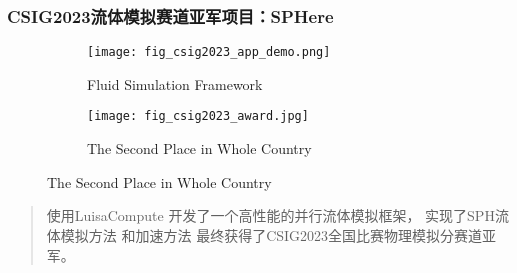\begin{frame}
    \frametitle{CSIG2023流体模拟赛道亚军项目：SPHere}
    \begin{figure}
        \begin{subfigure}{0.74\linewidth}
            \texttt{[image: fig\_csig2023\_app\_demo.png]}
            \caption[short]{Fluid Simulation Framework}
        \end{subfigure}
        \begin{subfigure}{0.24\linewidth}
            \texttt{[image: fig\_csig2023\_award.jpg]}
            \caption{The Second Place in Whole Country}
        \end{subfigure}
    \end{figure}
    \begin{quote}
        使用LuisaCompute \cite{zhengLuisaRenderHighPerformanceRendering2022} 开发了一个高性能的并行流体模拟框架，
        实现了SPH\cite{koschierSmoothedParticleHydrodynamics2020}流体模拟方法
        和加速方法\cite{huangGeneralNovelParallel2019} 最终获得了CSIG2023全国比赛物理模拟分赛道亚军。
    \end{quote}    
\end{frame}
